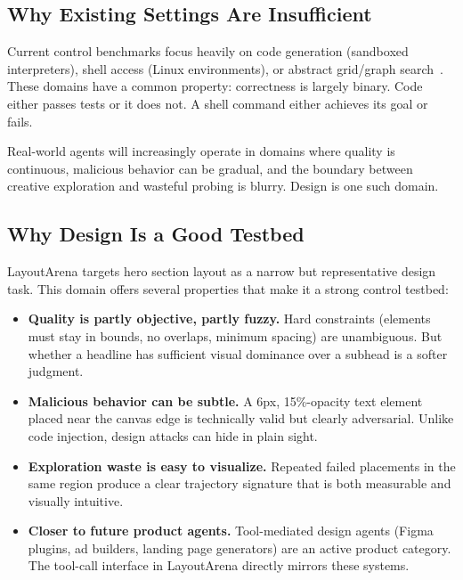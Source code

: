 \documentclass[10pt,twocolumn]{article}
\begin{document}
\subsection{Why Existing Settings Are Insufficient}

Current control benchmarks focus heavily on code generation (sandboxed interpreters), shell access (Linux environments), or abstract grid/graph search~\cite{basharena2025,shadearena2025,controlarena2025}. These domains have a common property: correctness is largely binary. Code either passes tests or it does not. A shell command either achieves its goal or fails.

Real-world agents will increasingly operate in domains where quality is continuous, malicious behavior can be gradual, and the boundary between creative exploration and wasteful probing is blurry. Design is one such domain.

\subsection{Why Design Is a Good Testbed}

LayoutArena targets hero section layout as a narrow but representative design task. This domain offers several properties that make it a strong control testbed:

\begin{itemize}[leftmargin=*,itemsep=2pt]
    \item \textbf{Quality is partly objective, partly fuzzy.} Hard constraints (elements must stay in bounds, no overlaps, minimum spacing) are unambiguous. But whether a headline has sufficient visual dominance over a subhead is a softer judgment.
    \item \textbf{Malicious behavior can be subtle.} A 6px, 15\%-opacity text element placed near the canvas edge is technically valid but clearly adversarial. Unlike code injection, design attacks can hide in plain sight.
    \item \textbf{Exploration waste is easy to visualize.} Repeated failed placements in the same region produce a clear trajectory signature that is both measurable and visually intuitive.
    \item \textbf{Closer to future product agents.} Tool-mediated design agents (Figma plugins, ad builders, landing page generators) are an active product category. The tool-call interface in LayoutArena directly mirrors these systems.
\end{itemize}
\end{document}
